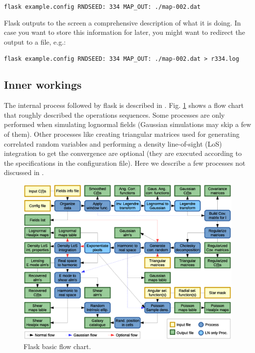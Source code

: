 \documentclass[12pt]{book} %
\begin{document}
\vspace{0.5cm}
\noindent
{\tt flask example.config RNDSEED: 334 MAP\_OUT: ./map-002.dat}
\vspace{0.5cm}

{\sc Flask} outputs to the screen a comprehensive description of what it is doing. In case you want to 
store this information for later, you might want to redirect the output to a file, e.g.: 

\vspace{0.5cm}
\noindent
{\tt flask example.config RNDSEED: 334 MAP\_OUT: ./map-002.dat > r334.log}
\vspace{0.5cm}

\subsection{Inner workings}
\label{sec:workings}

The internal process followed by {\sc flask} is described in \citet{Xavier16mn}. 
Fig. \ref{fig:flow-chart} shows a flow chart that roughly described the 
operations sequences. Some processes are only performed when simulating lognormal 
fields (Gaussian simulations may skip a few of them). Other processes like 
creating triangular matrices used for generating correlated random variables and 
performing a density line-of-sight (LoS) integration to get the convergence are 
optional (they are executed according to the specifications in the configuration file).
Here we describe a few processes not discussed in \citet{Xavier16mn}.

\begin{figure}
  \includegraphics[width=1\textwidth]{flask_flow_chart.eps}
  \caption{{\sc Flask} basic flow chart.}
\label{fig:flow-chart}  
\end{figure}
\end{document}
